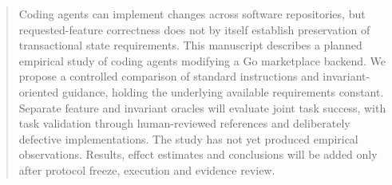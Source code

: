 \begin{abstract}
Coding agents can implement changes across software repositories, but requested-feature correctness
does not by itself establish preservation of transactional state requirements. This manuscript describes
a planned empirical study of coding agents modifying a Go marketplace backend. We propose a controlled
comparison of standard instructions and invariant-oriented guidance, holding the underlying available
requirements constant. Separate feature and invariant oracles will evaluate joint task success, with
task validation through human-reviewed references and deliberately defective implementations.
The study has not yet produced empirical observations. Results, effect estimates and conclusions
will be added only after protocol freeze, execution and evidence review.
\end{abstract}
